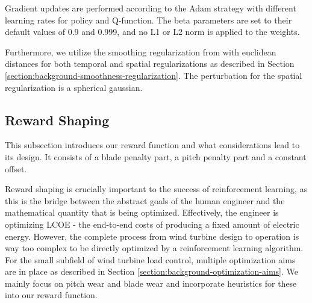 Gradient updates are performed according to the Adam strategy \cite{kingmaAdamMethodStochastic2017} with different learning rates for policy and Q-function. The beta parameters are set to their default values of 0.9 and 0.999, and no L1 or L2 norm is applied to the weights.

Furthermore, we utilize the smoothing regularization from \citet{mysoreRegularizingActionPolicies2021} with euclidean distances for both temporal and spatial regularizations as described in Section \ref{section:background-smoothness-regularization}. The perturbation for the spatial regularization is a spherical gaussian.




\subsection{Reward Shaping}
\label{section:approach-reward-shaping}

\begin{summary}
This subsection introduces our reward function and what considerations lead to its design. It consists of a blade penalty part, a pitch penalty part and a constant offset.
\end{summary}

Reward shaping is crucially important to the success of reinforcement learning, as this is the bridge between the abstract goals of the human engineer and the mathematical quantity that is being optimized. Effectively, the engineer is optimizing \acf{LCOE} - the end-to-end costs of producing a fixed amount of electric energy. However, the complete process from wind turbine design to operation is way too complex to be directly optimized by a reinforcement learning algorithm. For the small subfield of wind turbine load control, multiple optimization aims are in place as described in Section \ref{section:background-optimization-aims}. We mainly focus on pitch wear and blade wear and incorporate heuristics for these into our reward function.

